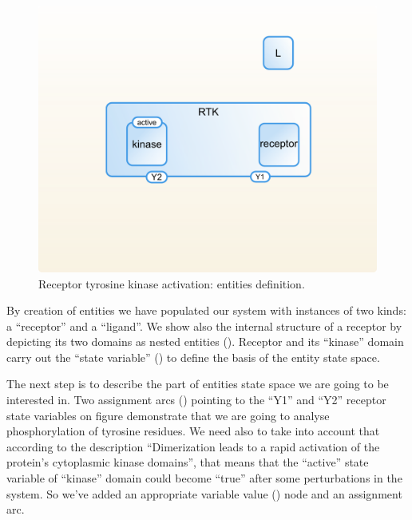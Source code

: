 \begin{figure}[H]
  \centering
  \vspace*{-0.75em}
  \includegraphics[scale=0.75]{examples/rtk-entities.png}
   \caption{Receptor tyrosine kinase activation: entities definition.}
  \label{fig:rtk-entities}
\end{figure}

By creation of entities we have populated our system with instances of two kinds: a ``receptor'' and a ``ligand''. We show also the internal structure of a receptor by depicting its two domains as nested entities (). Receptor and its ``kinase'' domain carry out the ``state variable'' () to define the basis of the entity state space.

The next step is to describe the part of entities state space we are going to be interested in. Two assignment arcs () pointing to the ``Y1'' and ``Y2'' receptor state variables on figure  demonstrate that we are going to analyse phosphorylation of tyrosine residues. We need also to take into account that according to the description ``Dimerization leads to a rapid activation of the protein's cytoplasmic kinase domains'', that means that the ``active'' state variable of ``kinase'' domain could become ``true'' after some perturbations in the system. So we've added an appropriate variable value () node and an assignment arc.

